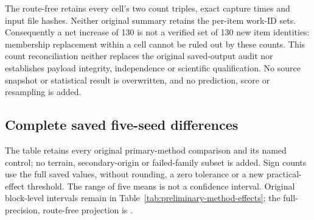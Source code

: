 \documentclass[11pt]{article}
\begin{document}
The route-free 
retains every cell's two count triples, exact capture times and input file
hashes. Neither original summary retains the per-item work-ID sets.
Consequently a net increase of 130 is not a verified set of 130 new item
identities: membership replacement within a cell cannot be ruled out by
these counts. This count reconciliation neither replaces the original
saved-output audit nor establishes payload integrity, independence or
scientific qualification. No source snapshot or statistical result is
overwritten, and no prediction, score or resampling is added.

\clearpage
\subsection{Complete saved five-seed differences}
\label{sec:method-seed-table}
The table retains every original primary-method comparison and its named
control; no terrain, secondary-origin or failed-family subset is added.
Sign counts use the full saved values, without rounding, a zero tolerance
or a new practical-effect threshold. The range of five means is not a
confidence interval. Original block-level intervals remain in
Table~\ref{tab:preliminary-method-effects}; the full-precision, route-free
projection is .


\clearpage
\end{document}
